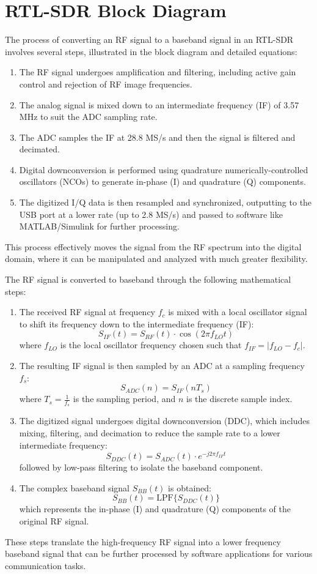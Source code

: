 \section*{RTL-SDR Block Diagram}

The process of converting an RF signal to a baseband signal in an RTL-SDR involves several steps, illustrated in the block diagram and detailed equations:
\begin{enumerate}
    \item The RF signal undergoes amplification and filtering, including active gain control and rejection of RF image frequencies.
    \item The analog signal is mixed down to an intermediate frequency (IF) of 3.57 MHz to suit the ADC sampling rate.
    \item The ADC samples the IF at 28.8 MS/s and then the signal is filtered and decimated.
    \item Digital downconversion is performed using quadrature numerically-controlled oscillators (NCOs) to generate in-phase (I) and quadrature (Q) components.
    \item The digitized I/Q data is then resampled and synchronized, outputting to the USB port at a lower rate (up to 2.8 MS/s) and passed to software like MATLAB/Simulink for further processing.
\end{enumerate}
This process effectively moves the signal from the RF spectrum into the digital domain, where it can be manipulated and analyzed with much greater flexibility.

The RF signal is converted to baseband through the following mathematical steps:

\begin{enumerate}
    \item The received RF signal at frequency \( f_c \) is mixed with a local oscillator signal to shift its frequency down to the intermediate frequency (IF):
    \[ S_{IF}(t) = S_{RF}(t) \cdot \cos(2\pi f_{LO} t) \]
    where \( f_{LO} \) is the local oscillator frequency chosen such that \( f_{IF} = |f_{LO} - f_c| \).

    \item The resulting IF signal is then sampled by an ADC at a sampling frequency \( f_s \):
    \[ S_{ADC}(n) = S_{IF}(nT_s) \]
    where \( T_s = \frac{1}{f_s} \) is the sampling period, and \( n \) is the discrete sample index.

    \item The digitized signal undergoes digital downconversion (DDC), which includes mixing, filtering, and decimation to reduce the sample rate to a lower intermediate frequency:
    \[ S_{DDC}(t) = S_{ADC}(t) \cdot e^{-j2\pi f_{IF} t} \]
    followed by low-pass filtering to isolate the baseband component.

    \item The complex baseband signal \( S_{BB}(t) \) is obtained:
    \[ S_{BB}(t) = \text{LPF}\{S_{DDC}(t)\} \]
    which represents the in-phase (I) and quadrature (Q) components of the original RF signal.
\end{enumerate}
These steps translate the high-frequency RF signal into a lower frequency baseband signal that can be further processed by software applications for various communication tasks.